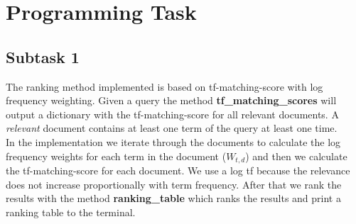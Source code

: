 \documentclass[a4paper]{scrartcl}
\begin{document}
\section*{Programming Task}

\subsection*{Subtask 1}

The ranking method implemented is based on tf-matching-score with log frequency weighting.
Given a query the method \textbf{tf\_matching\_scores} will output a dictionary with the tf-matching-score for all relevant documents.
A \textit{relevant} document contains at least one term of the query at least one time.\\

In the implementation we iterate through the documents to calculate the log frequency weights for each term in the document ($W_{t,d}$) 
and then we calculate the tf-matching-score for each document. We use a log tf because the relevance does not increase proportionally with term frequency.
After that we rank the results with the method \textbf{ranking\_table} which ranks the results and print a ranking table to the terminal.
\end{document}

